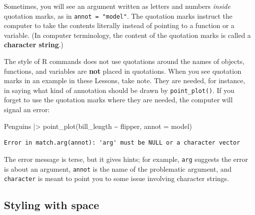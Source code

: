 \documentclass[
  letterpaper,
  DIV=11,
  numbers=noendperiod,
  oneside]{scrartcl}
\newenvironment{Shaded}{\begin{snugshade}}{\end{snugshade}}
\newcommand{\AttributeTok}[1]{\textcolor[rgb]{0.40,0.45,0.13}{#1}}
\newcommand{\FunctionTok}[1]{\textcolor[rgb]{0.28,0.35,0.67}{#1}}
\newcommand{\NormalTok}[1]{\textcolor[rgb]{0.00,0.23,0.31}{#1}}
\newcommand{\SpecialCharTok}[1]{\textcolor[rgb]{0.37,0.37,0.37}{#1}}
\begin{document}
\begin{tcolorbox}[enhanced jigsaw, colbacktitle=quarto-callout-warning-color!10!white, opacityback=0, breakable, opacitybacktitle=0.6, colback=white, coltitle=black, arc=.35mm, title=\textcolor{quarto-callout-warning-color}{\faExclamationTriangle}\hspace{0.5em}{Quotation marks}, left=2mm, colframe=quarto-callout-warning-color-frame, rightrule=.15mm, bottomrule=.15mm, leftrule=.75mm, bottomtitle=1mm, toptitle=1mm, titlerule=0mm, toprule=.15mm]

Sometimes, you will see an argument written as letters and numbers
\emph{inside} quotation marks, as in \texttt{annot\ =\ "model"}. The
quotation marks instruct the computer to take the contents literally
instead of pointing to a function or a variable. (In computer
terminology, the content of the quotation marks is called a
\textbf{character string}.)

The style of R commands does not use quotations around the names of
objects, functions, and variables are \textbf{not} placed in quotations.
When you see quotation marks in an example in these Lessons, take note.
They are needed, for instance, in saying what kind of annotation should
be drawn by \texttt{point\_plot()}. If you forget to use the quotation
marks where they are needed, the computer will signal an error:

\begin{Shaded}
\begin{Highlighting}[]
\NormalTok{Penguins }\SpecialCharTok{|\textgreater{}} \FunctionTok{point\_plot}\NormalTok{(bill\_length }\SpecialCharTok{\textasciitilde{}}\NormalTok{ flipper, }\AttributeTok{annot =}\NormalTok{ model) }
\end{Highlighting}
\end{Shaded}

\begin{verbatim}
Error in match.arg(annot): 'arg' must be NULL or a character vector
\end{verbatim}

The error message is terse, but it gives hints; for example,
\texttt{\textquotesingle{}arg\textquotesingle{}} suggests the error is
about an argument, \texttt{annot} is the name of the problematic
argument, and \texttt{character} is meant to point you to some issue
involving character strings.

\end{tcolorbox}

\subsection{Styling with space}\label{styling-with-space}
\end{document}
